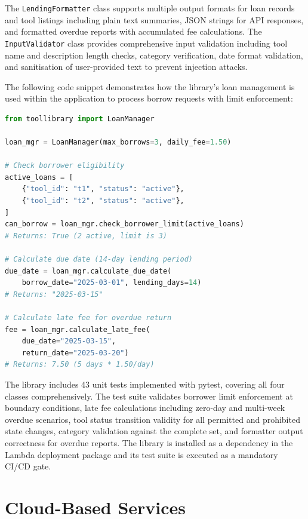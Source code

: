 \documentclass[conference]{IEEEtran}
\begin{document}
The \texttt{LendingFormatter} class supports multiple output formats for loan records and tool listings including plain text summaries, JSON strings for API responses, and formatted overdue reports with accumulated fee calculations. The \texttt{InputValidator} class provides comprehensive input validation including tool name and description length checks, category verification, date format validation, and sanitisation of user-provided text to prevent injection attacks.

The following code snippet demonstrates how the library's loan management is used within the application to process borrow requests with limit enforcement:

\begin{lstlisting}[language=Python, caption={LoanManager usage for borrow request processing}]
from toollibrary import LoanManager

loan_mgr = LoanManager(max_borrows=3, daily_fee=1.50)

# Check borrower eligibility
active_loans = [
    {"tool_id": "t1", "status": "active"},
    {"tool_id": "t2", "status": "active"},
]
can_borrow = loan_mgr.check_borrower_limit(active_loans)
# Returns: True (2 active, limit is 3)

# Calculate due date (14-day lending period)
due_date = loan_mgr.calculate_due_date(
    borrow_date="2025-03-01", lending_days=14)
# Returns: "2025-03-15"

# Calculate late fee for overdue return
fee = loan_mgr.calculate_late_fee(
    due_date="2025-03-15",
    return_date="2025-03-20")
# Returns: 7.50 (5 days * 1.50/day)
\end{lstlisting}

The library includes 43 unit tests implemented with pytest, covering all four classes comprehensively. The test suite validates borrower limit enforcement at boundary conditions, late fee calculations including zero-day and multi-week overdue scenarios, tool status transition validity for all permitted and prohibited state changes, category validation against the complete set, and formatter output correctness for overdue reports. The library is installed as a dependency in the Lambda deployment package and its test suite is executed as a mandatory CI/CD gate.

\section{Cloud-Based Services}
\end{document}

